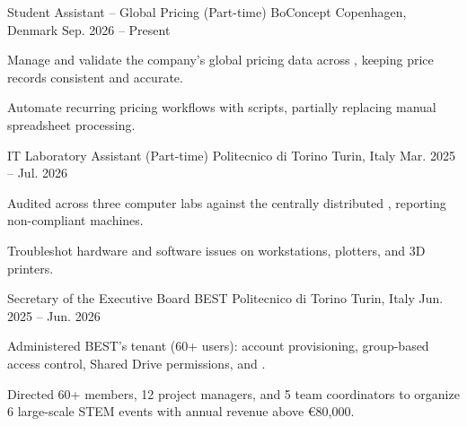 
\begin{cventries}

  \cventry
    {Student Assistant -- Global Pricing (Part-time)} %
    {BoConcept} %
    {Copenhagen, Denmark} %
    {Sep. 2026 -- Present} %
    {
      \begin{cvitems}
        \item {Manage and validate the company's global pricing data across , keeping price records consistent and accurate.}
        \item {Automate recurring pricing workflows with  scripts, partially replacing manual spreadsheet processing.}
      \end{cvitems}
    }

  \cventry
    {IT Laboratory Assistant (Part-time)} %
    {Politecnico di Torino} %
    {Turin, Italy} %
    {Mar. 2025 -- Jul. 2026} %
    {
      \begin{cvitems}
        \item {Audited  across three computer labs against the centrally distributed , reporting non-compliant machines.}
        \item {Troubleshot hardware and software issues on  workstations, plotters, and 3D printers.}
      \end{cvitems}
    }

  \cventry
    {Secretary of the Executive Board} %
    {BEST Politecnico di Torino} %
    {Turin, Italy} %
    {Jun. 2025 -- Jun. 2026} %
    {
      \begin{cvitems} %
        \item {Administered BEST's  tenant (60+ users): account provisioning, group-based access control,  Shared Drive permissions, and .}
        \item {Directed 60+ members, 12 project managers, and 5 team coordinators to organize 6 large-scale STEM events with annual revenue above €80,000.}
      \end{cvitems}
    }

\end{cventries}
